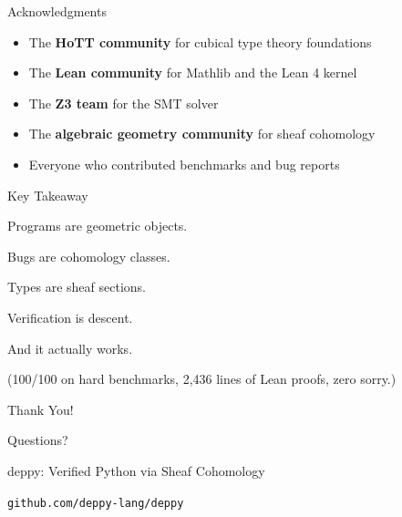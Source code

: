 \documentclass[aspectratio=169,11pt]{beamer}
\newcommand{\site}{\mathcal{S}}
\begin{document}
\begin{frame}{Acknowledgments}
\begin{itemize}
\item The \textbf{HoTT community} for cubical type theory foundations
\item The \textbf{Lean community} for Mathlib and the Lean 4 kernel
\item The \textbf{Z3 team} for the SMT solver
\item The \textbf{algebraic geometry community} for sheaf cohomology
\item Everyone who contributed benchmarks and bug reports
\end{itemize}
\end{frame}

\begin{frame}{Key Takeaway}
\begin{center}
{\Large
Programs are geometric objects.

\vspace{0.5em}
Bugs are cohomology classes.

\vspace{0.5em}
Types are sheaf sections.

\vspace{0.5em}
Verification is descent.
}

\vspace{1em}
{\large\color{blue} And it actually works.}

\vspace{0.5em}
(100/100 on hard benchmarks, 2,436 lines of Lean proofs, zero sorry.)
\end{center}
\end{frame}

\begin{frame}{Thank You!}
\begin{center}
{\Huge\color{blue} Questions?}

\vspace{1.5em}
{\large deppy: Verified Python via Sheaf Cohomology}

\vspace{1em}
\texttt{github.com/deppy-lang/deppy}

\vspace{1em}
\end{center}
\end{frame}
\end{document}
